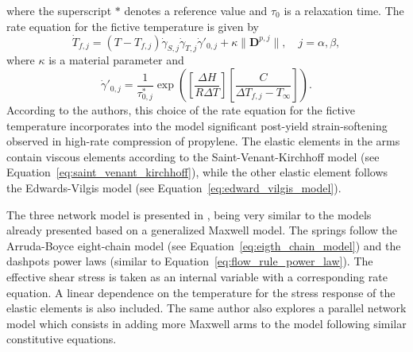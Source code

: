 where the superscript $*$ denotes a reference value and $\tau_0$ is a relaxation time.
The rate equation for the fictive temperature is given by
\begin{equation}
	\dot T_{f,j} = (T - T_{f,j})\dot\gamma_{S,j}\dot\gamma_{T,j}\dot\gamma'_{0,j} + \kappa \|\bm D^{p,j}\|,\quad j = \alpha, \beta,
\end{equation}
where $\kappa$ is a material parameter and
\begin{equation}
	\dot \gamma'_{0,j} = \frac{1}{\tau^*_{0,j}} \exp\left(\left[\frac{\Delta H}{R\Delta T}\right]\left[\frac{C}{\Delta T_{f,j} - T_\infty}\right]\right).
\end{equation}
According to the authors, this choice of the rate equation for the fictive temperature incorporates into the model significant post-yield strain-softening observed in high-rate compression of propylene.
The elastic elements in the arms contain viscous elements according to the Saint-Venant-Kirchhoff model (see Equation~\eqref{eq:saint_venant_kirchhoff}), while the other elastic element follows the Edwards-Vilgis model (see Equation~\eqref{eq:edward_vilgis_model}).

The three network model is presented in \citep{bergstromMechanicsSolidPolymers2015}, being very similar to the models already presented based on a generalized Maxwell model.
The springs follow the Arruda-Boyce eight-chain model (see Equation~\eqref{eq:eigth_chain_model}) and the dashpots power laws (similar to Equation~\eqref{eq:flow_rule_power_law}).
The effective shear stress is taken as an internal variable with a corresponding rate equation.
A linear dependence on the temperature for the stress response of the elastic elements is also included.
The same author also explores a parallel network model which consists in adding more Maxwell arms to the model following similar constitutive equations.

